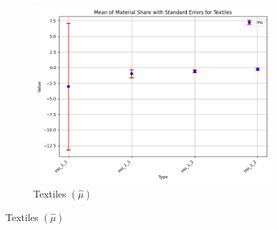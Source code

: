 \documentclass{article}
\begin{document}
\begin{figure}[ht!]
\begin{subfigure}[t]{0.32\textwidth}
        \centering
        \includegraphics[width=\textwidth]{figure/empirical_stat_mixture_kmshare_ciiu_mu_with_error_bars_Textiles.png}
        \caption{Textiles $(\hat\mu)$}
    \end{subfigure}


\end{figure}
\end{document}
